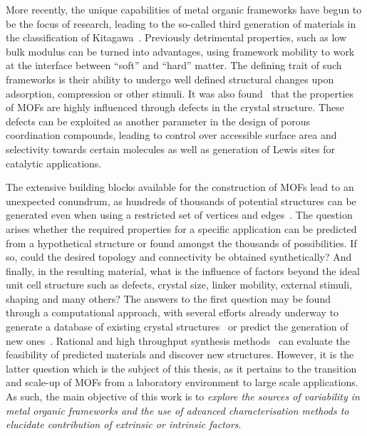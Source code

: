 More recently, the unique capabilities of metal organic frameworks
have begun to be the focus of research, leading to the so-called third 
generation of materials in the classification of 
Kitagawa~\cite{kondoMicroporousMaterialsConstructed2000}.
Previously detrimental properties, such as low bulk modulus
can be turned into advantages, using framework mobility to 
work at the interface between ``soft'' and ``hard'' matter.
The defining trait of such frameworks is their ability to 
undergo well defined structural changes upon adsorption,
compression or other stimuli.
It was also found~\cite{valenzanoDisclosingComplexStructure2011} 
that the properties of \glspl{MOF} are highly influenced
through defects in the crystal structure. These defects 
can be exploited as another parameter in the design of 
porous coordination compounds, leading to control over 
accessible surface area and selectivity towards certain molecules
as well as generation of Lewis sites for catalytic applications.

The extensive building blocks available for the construction 
of \glspl{MOF} lead to an unexpected conundrum, as hundreds of thousands
of potential structures can be generated even when using 
a restricted set of vertices and 
edges~\cite{wilmerLargescaleScreeningHypothetical2012}.
The question arises whether the required properties
for a specific application can be predicted from a hypothetical 
structure or found amongst the thousands of possibilities. 
If so, could the desired topology and connectivity be
obtained synthetically? And finally, in the resulting material,
what is the influence of factors beyond the ideal unit cell 
structure such as defects, crystal size, linker mobility, 
external stimuli, shaping and many others?
The answers to the first question may be found through a 
computational approach, with several efforts already underway 
to generate a database of existing crystal 
structures~\cite{chungComputationReadyExperimentalMetal2014, %
moghadamDevelopmentCambridgeStructural2017}
or predict the generation of new 
ones~\cite{raccugliaMachinelearningassistedMaterialsDiscovery2016}.
Rational and high throughput synthesis
methods~\cite{stockSynthesisMetalOrganicFrameworks2012} can 
evaluate the feasibility of predicted materials and discover 
new structures. However, it is the latter question which is
the subject of this thesis, as it pertains to the transition
and scale-up of \glspl{MOF} from a laboratory environment to 
large scale applications.
As such, the main objective of this work is to 
\textit{explore the sources of variability in metal organic 
frameworks and the use of advanced characterisation methods
to elucidate contribution of extrinsic or intrinsic factors}. 

